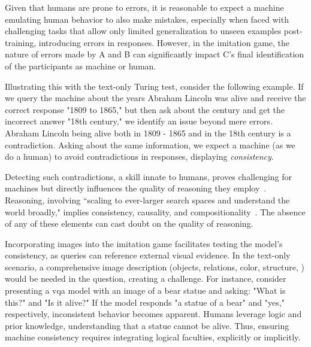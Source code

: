 Given that humans are prone to errors, it is reasonable to expect a machine emulating human behavior to also make mistakes, especially when faced with challenging tasks that allow only limited generalization to unseen examples post-training, introducing errors in responses. However, in the imitation game, the nature of errors made by A and B can significantly impact C's final identification of the participants as machine or human. 

Illustrating this with the text-only Turing test, consider the following example. If we query the machine about the years Abraham Lincoln was alive and receive the correct response "1809 to 1865," but then ask about the century and get the incorrect answer "18th century," we identify an issue beyond mere errors. Abraham Lincoln being alive both in 1809 - 1865 and in the 18th century is a contradiction. Asking about the same information, we expect a machine (as we do a human) to avoid contradictions in responses, displaying \textit{consistency}.

Detecting such contradictions, a skill innate to humans, proves challenging for machines but directly influences the quality of reasoning they employ~\cite{selvaraju2020squinting}. Reasoning, involving ``scaling to ever-larger search spaces and understand the world broadly," implies consistency, causality, and compositionality~\cite{kervadec2021bias}. The absence of any of these elements can cast doubt on the quality of reasoning.

Incorporating images into the imitation game facilitates testing the model's consistency, as queries can reference external visual evidence. In the text-only scenario, a comprehensive image description (objects, relations, color, structure, \etc) would be needed in the question, creating a challenge. For instance, consider presenting a \gls{vqa} model with an image of a bear statue and asking: "What is this?" and "Is it alive?" If the model responds "a statue of a bear" and "yes," respectively, inconsistent behavior becomes apparent. Humans leverage logic and prior knowledge, understanding that a statue cannot be alive. Thus, ensuring machine consistency requires integrating logical faculties, explicitly or implicitly.


